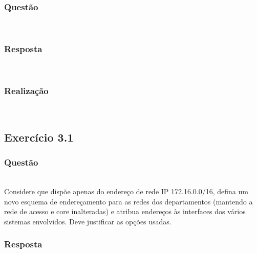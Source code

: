 \documentclass{llncs}
\begin{document}
\subsubsection{Questão}\rule[-10pt]{0pt}{10pt}\\
\subsubsection{Resposta}\rule[-10pt]{0pt}{10pt}\\
\subsubsection{Realização}\rule[-10pt]{0pt}{10pt}\\


\subsection{Exercício 3.1}
\subsubsection{Questão}\rule[-10pt]{0pt}{10pt}\\

Considere que dispõe apenas do endereço de rede IP 172.16.0.0/16, defina um novo esquema de endereçamento para as redes dos departamentos (mantendo a rede de acesso e core inalteradas) e atribua endereços às interfaces dos vários sistemas envolvidos. Deve justificar as opções usadas.

\subsubsection{Resposta}\rule[-10pt]{0pt}{10pt}\\
\end{document}
